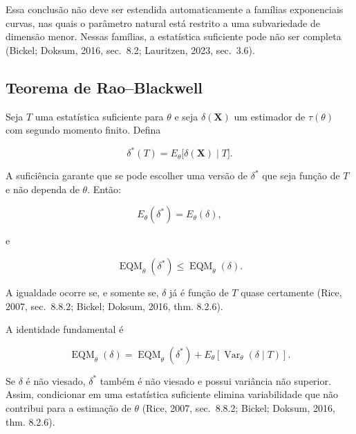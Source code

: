 \documentclass[
  letterpaper,
  DIV=11,
  numbers=noendperiod]{scrreprt}
\begin{document}
Essa conclusão não deve ser estendida automaticamente a famílias
exponenciais curvas, nas quais o parâmetro natural está restrito a uma
subvariedade de dimensão menor. Nessas famílias, a estatística
suficiente pode não ser completa (Bickel; Doksum, 2016, sec.~8.2;
Lauritzen, 2023, sec.~3.6).

\subsection*{Teorema de Rao--Blackwell}\label{teorema-de-raoblackwell}

\begin{tcolorbox}[enhanced jigsaw, colback=white, leftrule=.75mm, colbacktitle=quarto-callout-important-color!10!white, breakable, titlerule=0mm, bottomtitle=1mm, title=\textcolor{quarto-callout-important-color}{\faExclamation}\hspace{0.5em}{Teorema --- Rao--Blackwell}, colframe=quarto-callout-important-color-frame, toprule=.15mm, opacityback=0, bottomrule=.15mm, opacitybacktitle=0.6, arc=.35mm, toptitle=1mm, rightrule=.15mm, coltitle=black, left=2mm]

Seja \(T\) uma estatística suficiente para \(\theta\) e seja
\(\delta(\mathbf{X})\) um estimador de \(\tau(\theta)\) com segundo
momento finito. Defina

\[\delta^*(T)
=
E_\theta\bigl[\delta(\mathbf{X})\mid T\bigr].\]

A suficiência garante que se pode escolher uma versão de \(\delta^*\)
que seja função de \(T\) e não dependa de \(\theta\). Então:

\[E_\theta(\delta^*)=E_\theta(\delta),\]

e

\[\operatorname{EQM}_\theta(\delta^*)
\leq
\operatorname{EQM}_\theta(\delta).\]

A igualdade ocorre se, e somente se, \(\delta\) já é função de \(T\)
quase certamente (Rice, 2007, sec.~8.8.2; Bickel; Doksum, 2016, thm.
8.2.6).

\end{tcolorbox}

A identidade fundamental é

\[\operatorname{EQM}_\theta(\delta)
=
\operatorname{EQM}_\theta(\delta^*)
+
E_\theta\left[
\operatorname{Var}_\theta(\delta\mid T)
\right].\]

Se \(\delta\) é não viesado, \(\delta^*\) também é não viesado e possui
variância não superior. Assim, condicionar em uma estatística suficiente
elimina variabilidade que não contribui para a estimação de \(\theta\)
(Rice, 2007, sec.~8.8.2; Bickel; Doksum, 2016, thm. 8.2.6).
\end{document}
